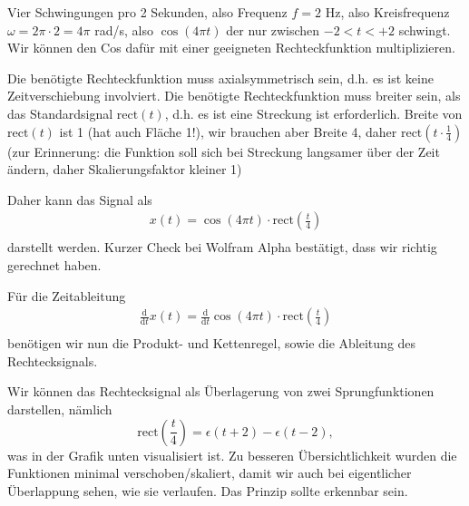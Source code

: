\documentclass[11pt,a4paper,DIV=12]{scrartcl}
\numberwithin{equation}{section}
\numberwithin{figure}{section}
\newcommand\fsd{\mathrm{d}} %
\begin{document}
\begin{ExCalc}
Vier Schwingungen pro 2 Sekunden, also Frequenz $f=2$ Hz, also Kreisfrequenz
$\omega=2\pi\cdot 2 = 4\pi$ rad/s, also $\cos(4\pi t)$ der nur zwischen
$-2 < t < +2$ schwingt. Wir können den Cos dafür mit einer geeigneten Rechteckfunktion
multiplizieren.

Die benötigte Rechteckfunktion muss axialsymmetrisch sein, d.h. es ist keine
Zeitverschiebung involviert.
Die benötigte Rechteckfunktion muss breiter sein, als das Standardsignal
$\mathrm{rect}(t)$, d.h. es ist eine Streckung ist erforderlich.
Breite von $\mathrm{rect}(t)$ ist 1 (hat auch Fläche 1!), wir brauchen aber
Breite 4, daher $\mathrm{rect}(t\cdot \frac{1}{4})$ (zur Erinnerung:
die Funktion soll sich bei Streckung langsamer über der Zeit ändern, daher
Skalierungsfaktor kleiner 1)

Daher kann das Signal als
\begin{align}
x(t) = \cos(4\pi t) \cdot \mathrm{rect}(\frac{t}{4})\\
\end{align}
darstellt werden. Kurzer Check bei Wolfram Alpha bestätigt, dass wir richtig
gerechnet haben.

Für die Zeitableitung
\begin{align}
\frac{\fsd }{\fsd t} x(t) =
\frac{\fsd }{\fsd t} \cos(4\pi t) \cdot \mathrm{rect}(\frac{t}{4})\\
\end{align}
benötigen wir nun die Produkt- und Kettenregel, sowie die Ableitung des Rechtecksignals.

Wir können das Rechtecksignal als Überlagerung von zwei Sprungfunktionen darstellen,
nämlich
\begin{equation}
\mathrm{rect}(\frac{t}{4}) = \epsilon(t+2) -\epsilon(t-2),
\end{equation}
was in der Grafik unten visualisiert ist. Zu besseren Übersichtlichkeit wurden die
Funktionen minimal verschoben/skaliert, damit wir auch bei eigentlicher
Überlappung sehen, wie sie verlaufen. Das Prinzip sollte erkennbar sein.
%
\begin{center}
\end{center}


\end{ExCalc}
\end{document}

